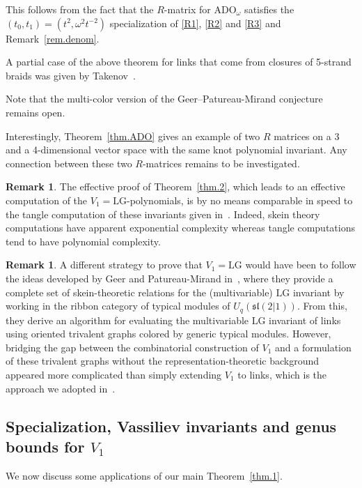 \documentclass[12pt,reqno]{amsart}
\theoremstyle{definition}
\newtheorem{remark}[theorem]{Remark}
\def\LG{\mathrm{LG}}
\def\ADO{\mathrm{ADO}}
\begin{document}
This follows from the fact that the $R$-matrix for $\ADO_\omega$ satisfies
the $(t_0,t_1)=(t^2,\omega^2 t^{-2})$ specialization of \eqref{R1}, \eqref{R2}
and \eqref{R3}
and Remark~\ref{rem.denom}.

A partial case of the above theorem for links that come from closures of
5-strand braids was given by Takenov~\cite{Ta}.

Note that the multi-color version of the Geer--Patureau-Mirand conjecture remains
open.

Interestingly, Theorem~\ref{thm.ADO} gives an example of two $R$ matrices on
a 3 and a 4-dimensional vector space with the same knot polynomial invariant.
Any connection between these two $R$-matrices remains to be investigated.

\begin{remark}
The effective proof of Theorem~\ref{thm.2}, which leads to an effective computation
of the $V_1=\LG$-polynomials, is by no means comparable in speed to the tangle
computation of these invariants given in~\cite{GL:patterns}. Indeed, skein theory
computations have apparent exponential complexity whereas tangle computations
tend to have polynomial complexity. 
\end{remark}

\begin{remark}
    A different strategy to prove that $V_1=\LG$ would have been to follow the ideas developed by Geer and Patureau-Mirand in~\cite{GP2}, where they provide a complete set of skein-theoretic relations for the (multivariable) $\LG$ invariant by working in the ribbon category of typical modules of $U_q(\mathfrak{sl}(2|1))$. From this, they derive an algorithm for evaluating the multivariable $\LG$ invariant of links using oriented trivalent graphs colored by generic typical modules. However, bridging the gap between the combinatorial construction of $V_1$ and a formulation of these trivalent graphs without the representation-theoretic background appeared more complicated than simply extending $V_1$ to links, which is the approach we adopted in~\cite{GHKST}.
\end{remark}
  
\subsection{Specialization, Vassiliev invariants and genus bounds for \texorpdfstring{$V_1$}{V1}}

We now discuss some applications of our main Theorem~\ref{thm.1}.
\end{document}
